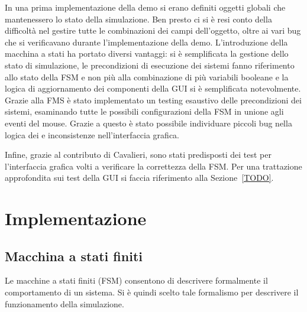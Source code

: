 In una prima implementazione della demo si erano definiti oggetti globali che mantenessero lo stato della simulazione.
Ben presto ci si è resi conto della difficoltà nel gestire tutte le combinazioni dei campi dell'oggetto, oltre
ai vari bug che si verificavano durante l'implementazione della demo.
L'introduzione della macchina a stati ha portato diversi vantaggi: si è semplificata la gestione dello
stato di simulazione, le precondizioni di esecuzione dei sistemi fanno riferimento allo stato della FSM e non più alla
combinazione di più variabili booleane e la logica di aggiornamento dei componenti della GUI si è semplificata
notevolmente.
Grazie alla FMS è stato implementato un testing esaustivo delle precondizioni dei sistemi, esaminando tutte
le possibili configurazioni della FSM in unione agli eventi del mouse.
Grazie a questo è stato possibile individuare piccoli bug nella logica dei \System e inconsistenze nell'interfaccia
grafica.

Infine, grazie al contributo di Cavalieri, sono stati predisposti dei test per l'interfaccia grafica volti a verificare
la correttezza della FSM. Per una trattazione approfondita sui test della GUI si faccia riferimento alla
Sezione~\ref{TODO}.

\section{Implementazione}\label{sec:demo-implementazione}
\subsection{Macchina a stati finiti}\label{subsec:macchina-a-stati-finiti}
Le macchine a stati finiti (FSM) consentono di descrivere formalmente il comportamento di un sistema.
Si è quindi scelto tale formalismo per descrivere il funzionamento della simulazione.

